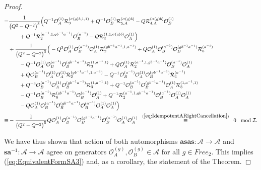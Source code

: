 \documentclass{amsart}
\newcommand{\Oa}{\mathcal O_A}
\newcommand{\Ob}{\mathcal O_B}
\newcommand{\R}{\mathcal R}
\begin{document}
\begin{proof}
\begin{equation*}
\begin{aligned}
=&\frac1{\big(Q^2-Q^{-2}\big)^3}\Big(Q^{-1}\Oa^{(1)}\R_{3}^{(\sigma(g)b,1,1)}+Q^{-1}\Ob^{(1)}\R_{5,A}^{(\sigma(g)b)}-Q\R_{4,A}^{(\sigma(g)b)}\Ob^{(1)}\\
&\qquad+Q^{-1}\R_{2}^{(a^{-1},1,gb^{-1}a^{-1})}\Ob^{(a^{-1})}-Q\R_{3}^{(1,1,\sigma(g)b)}\Oa^{(1)}\Big)\\
&+\frac1{\big(Q^2-Q^{-2}\big)^5}\Big(-Q^3\Oa^{(1)}\Ob^{(a^{-1})}\Oa^{(1)}\R_{2}^{(gb^{-1}a^{-1},1,a^{-1})}+Q\Oa^{(1)}\Ob^{(a^{-1})}\Ob^{(gb^{-1}a^{-1})}\R_{6}^{(a^{-1})}\\
&\qquad-Q^{-1}\Oa^{(1)}\Ob^{(a^{-1})}\Ob^{(gb^{-1}a^{-1})}\R_{3}^{(1,a^{-1},1)}+Q\Oa^{(1)}\R_{2}^{(a^{-1},1,gb^{-1}a^{-1})}\Ob^{(a^{-1})}\Oa^{(1)}\\
&\qquad+Q\Ob^{(a^{-1})}\Oa^{(1)}\Oa^{(1)}\R_{2}^{(gb^{-1}a^{-1},1,a^{-1})}-Q^{-1}\Ob^{(a^{-1})}\Oa^{(1)}\Ob^{(gb^{-1}a^{-1})}\R_{6}^{(a^{-1})}\\
&\qquad+Q^{-3}\Ob^{(a^{-1})}\Oa^{(1)}\Ob^{(gb^{-1}a^{-1})}\R_{3}^{(1,a^{-1},1)}+Q^{-1}\Ob^{(a^{-1})}\Ob^{(gb^{-1}a^{-1})}\Oa^{(1)}\R_{3}^{(1,a^{-1},1)}\\
&\qquad-Q^{-1}\Ob^{(a^{-1})}\R_{6}^{(gb^{-1}a^{-1})}\Ob^{(a^{-1})}\Oa^{(1)}+Q^{-1}\R_{2}^{(a^{-1},1,gb^{-1}a^{-1})}\Ob^{(a^{-1})}\Oa^{(1)}\Oa^{(1)}\\
&\qquad-Q\Oa^{(1)}\Ob^{(a^{-1})}\Ob^{(gb^{-1}a^{-1})}\Ob^{(a^{-1})}\Oa^{(1)}\Oa^{(1)}\Big)\\
\equiv&-\frac1{\big(Q^2-Q^{-2}\big)^5}Q\Oa^{(1)}\Ob^{(a^{-1})}\Ob^{(gb^{-1}a^{-1})}\Ob^{(a^{-1})}\Oa^{(1)}\Oa^{(1)}\;\;\overset{(\ref{eq:IdempotentARightCancellation})}{\equiv}\;\;0\;\;\bmod\mathcal I.
\end{aligned}
\end{equation*}

We have thus shown that action of both automorphisms $\mathbf a\mathbf s\mathbf a\mathbf s:\mathcal A\rightarrow\mathcal A$ and $\mathbf s\mathbf a^{-1}:\mathcal A\rightarrow\mathcal A$ agree on generators $\Oa^{(g)},\Ob^{(g)}\in\mathcal A$ for all $g\in Free_2$. This implies (\ref{eq:EquivalentFormSA3}) and, as a corollary, the statement of the Theorem.
\end{proof}
\end{document}

